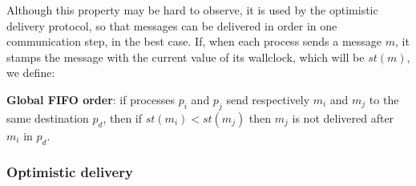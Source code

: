 \documentclass[times, 10pt]{article}
\begin{document}
Although this property may be hard to observe, it is used by the optimistic delivery protocol, so that messages can be delivered in order in one communication step, in the best case. If, when each process sends a message $m$, it stamps the message with the current value of its wallclock, which will be $st(m)$, we define:

\textbf{Global FIFO order}: if processes $p_i$ and $p_j$ send respectively $m_i$ and $m_j$ to the same destination $p_d$, then if $st(m_i) < st(m_j)$ then $m_j$ is not delivered after $m_i$ in $p_d$.



\subsubsection{Optimistic delivery}



\end{document}
